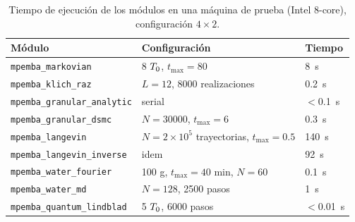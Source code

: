 \begin{table}[h]
\centering
\caption{Tiempo de ejecución de los módulos en una máquina de prueba (Intel 
8-core), configuración $4 \times 2$.}
\label{tab:performance}
\small
\begin{tabular}{lll}
\toprule
\textbf{Módulo} & \textbf{Configuración} & \textbf{Tiempo} \\
\midrule
\texttt{mpemba\_markovian} & 8 $T_{0}$, $t_{\max} = 80$ & \SI{8}{\second} \\
\texttt{mpemba\_klich\_raz} & $L = 12$, 8000 realizaciones & \SI{0.2}{\second} \\
\texttt{mpemba\_granular\_analytic} & serial & $<$\SI{0.1}{\second} \\
\texttt{mpemba\_granular\_dsmc} & $N = 30000$, $t_{\max} = 6$ & \SI{0.3}{\second} \\
\texttt{mpemba\_langevin} & $N = 2 \times 10^5$ trayectorias, $t_{\max} = 0.5$ & \SI{140}{\second} \\
\texttt{mpemba\_langevin\_inverse} & idem & \SI{92}{\second} \\
\texttt{mpemba\_water\_fourier} & 100 g, $t_{\max} = 40$ min, $N = 60$ & \SI{0.1}{\second} \\
\texttt{mpemba\_water\_md} & $N = 128$, 2500 pasos & \SI{1}{\second} \\
\texttt{mpemba\_quantum\_lindblad} & 5 $T_{0}$, 6000 pasos & $<$\SI{0.01}{\second} \\
\bottomrule
\end{tabular}
\end{table}

